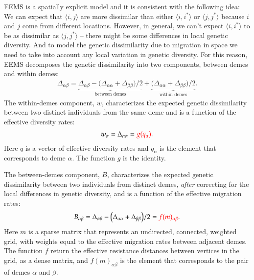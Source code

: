\documentclass[a4paper,10pt,DIV=15,titlepage,mpinclude=true]{scrartcl}
\begin{document}
EEMS is a spatially explicit model and it is consistent with the following idea: We can expect that $\langle i,j\rangle$ are more dissimilar than either $\langle i,i^*\rangle$ or $\langle j,j^*\rangle$ because $i$ and $j$ come from different locations. However, in general, we can't expect $\langle i,i^*\rangle$ to be as dissimilar as $\langle j,j^*\rangle$ -- there might be some differences in local genetic diversity. And to model the genetic dissimilarity due to migration in space we need to take into account any local variation in genetic diversity. For this reason, EEMS decomposes the genetic dissimilarity into two components, between demes and within demes:
\begin{align}
\Delta_{\alpha\beta} = \underbrace{\Delta_{\alpha\beta} - \big(\Delta_{\alpha\alpha}+\Delta_{\beta\beta}\big)/2}_{\text{between demes}} + \underbrace{\big(\Delta_{\alpha\alpha}+\Delta_{\beta\beta}\big)/2}_{\text{within demes}}.
\end{align}
The within-demes component, $w$, characterizes the expected genetic dissimilarity between two distinct individuals from the same deme and is a function of the effective diversity rates:
\begin{align}
w_\alpha = \Delta_{\alpha\alpha} = {\color{red} g(q_\alpha)}.
\end{align}
Here $q$ is a vector of effective diversity rates and $q_\alpha$ is the element that corresponds to deme $\alpha$. The function $g$ is the identity.

The between-demes component, $B$, characterizes the expected genetic dissimilarity between two individuals from distinct demes, \textit{after} correcting for the local differences in genetic diversity, and is a function of the effective migration rates: 
\begin{align}
B_{\alpha\beta} = \Delta_{\alpha\beta} - \big(\Delta_{\alpha\alpha}+\Delta_{\beta\beta}\big)/2 = {\color{red} f(m)_{\alpha\beta}}.
\end{align}
Here $m$ is a sparse matrix that represents an undirected, connected, weighted grid, with weights equal to the effective migration rates between adjacent demes. The function $f$ return the effective resistance distances between vertices in the grid, as a dense matrix, and $f(m)_{\alpha\beta}$ is the element that corresponds to the pair of demes $\alpha$ and $\beta$.
\end{document}
